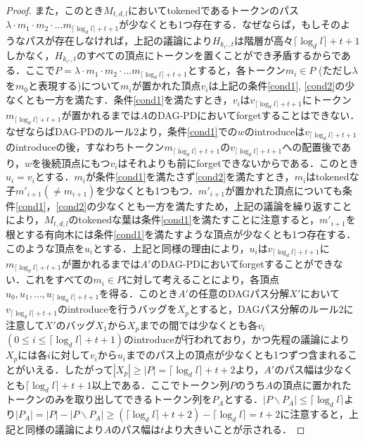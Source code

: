 \documentclass[master]{kuisthesis}		%
\theoremstyle{plain}
\theoremstyle{definition}
\begin{document}
\begin{proof}
また，このとき$M_{t, d, l}$においてtokenedであるトークンのパス$\lambda \cdot m_1 \cdot m_2 \cdot \dots m_{\lceil \log_d l \rceil +t+1}$が少なくとも1つ存在する．なぜならば，もしそのようなパスが存在しなければ，上記の議論により$H_{k_{r'}, t}$は階層が高々$\lceil \log_d l \rceil +t+1$しかなく，$H_{k_{r'}, t}$のすべての頂点にトークンを置くことができ矛盾するからである．ここで$P = \lambda \cdot m_1 \cdot m_2 \cdot \dots m_{\lceil \log_d l \rceil +t+1}$とすると，各トークン$m_i \in P$ (ただし$\lambda$を$m_0$と表現する)について$m_i$が置かれた頂点$v_i$は上記の条件\ref{cond1}, \ref{cond2}の少なくとも一方を満たす．条件\ref{cond1}を満たすとき，$v_i$は$v_{\lceil \log_d l \rceil +t+1}$にトークン$m_{\lceil \log_d l \rceil +t+1}$が置かれるまでは$A$のDAG-PDにおいてforgetすることはできない．なぜならばDAG-PDのルール2より，条件\ref{cond1}での$w$のintroduceは$v_{\lceil \log_d l \rceil +t+1}$のintroduceの後，すなわちトークン$m_{\lceil \log_d l \rceil +t+1}$の$v_{\lceil \log_d l \rceil +t+1}$への配置後であり，$w$を後続頂点にもつ$v_i$はそれよりも前にforgetできないからである．このとき$u_i=v_i$とする．$m_i$が条件\ref{cond1}を満たさず\ref{cond2}を満たすとき，$m_i$はtokenedな子$m'_{i+1} (\neq m_{i+1})$を少なくとも1つもつ．$m'_{i+1}$が置かれた頂点についても条件\ref{cond1}，\ref{cond2}の少なくとも一方を満たすため，上記の議論を繰り返すことにより，$M_{t, d, l}$のtokenedな葉は条件\ref{cond1}を満たすことに注意すると，$m'_{i+1}$を根とする有向木には条件\ref{cond1}を満たすような頂点が少なくとも1つ存在する．このような頂点を$u_i$とする．上記と同様の理由により，$u_i$は$v_{\lceil \log_d l \rceil +t+1}$に$m_{\lceil \log_d l \rceil +t+1}$が置かれるまでは$A'$のDAG-PDにおいてforgetすることができない．これをすべての$m_i \in P$に対して考えることにより，各頂点$u_0, u_1, \dots, u_{\lceil \log_d l \rceil +t+1}$を得る．このとき$A'$の任意のDAGパス分解$X'$において$v_{\lceil \log_d l \rceil +t+1}$のintroduceを行うバッグを$X_p$とすると，DAGパス分解のルール2に注意して$X'$のバッグ$X_1$から$X_p$までの間では少なくとも各$v_i$ $(0 \leq i \leq \lceil \log_d l \rceil +t+1)$のintroduceが行われており，かつ先程の議論により$X_p$には各$i$に対して$v_i$から$u_i$までのパス上の頂点が少なくとも1つずつ含まれることがいえる．したがって$|X_p| \geq |P| = \lceil \log_d l \rceil +t+2$より，$A'$のパス幅は少なくとも$\lceil \log_d l \rceil +t+1$以上である．ここでトークン列$P$のうち$A$の頂点に置かれたトークンのみを取り出してできるトークン列を$P_A$とする．$|P \backslash P_A| \leq \lceil \log_d l \rceil$より$|P_A| = |P| - |P \backslash P_A| \geq (\lceil \log_d l \rceil +t+2) - \lceil \log_d l \rceil = t+2$に注意すると，上記と同様の議論により$A$のパス幅は$t$より大きいことが示される．
\end{proof}
\end{document}

